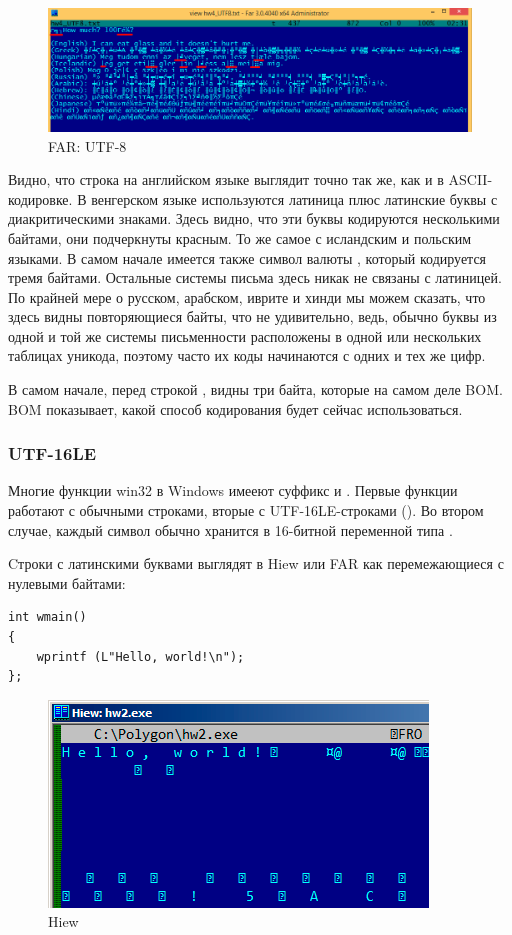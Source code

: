 \begin{figure}[H]
\centering
\includegraphics[scale=\FigScale]{digging_into_code/strings/multilang_sampler_UTF8.png}
\caption{FAR: UTF-8}
\end{figure}

Видно, что строка на английском языке выглядит точно так же, как и в ASCII-кодировке.
В венгерском языке используются латиница плюс латинские буквы с диакритическими знаками.
Здесь видно, что эти буквы кодируются несколькими байтами, они подчеркнуты красным.
То же самое с исландским и польским языками.
В самом начале имеется также символ валюты , который кодируется тремя байтами.
Остальные системы письма здесь никак не связаны с латиницей.
По крайней мере о русском, арабском, иврите и хинди мы можем сказать, что здесь видны повторяющиеся
байты, что не удивительно, ведь, обычно буквы из одной и той же системы письменности расположены в одной
или нескольких таблицах уникода, поэтому часто их коды начинаются с одних и тех же цифр.

В самом начале, перед строкой , видны три байта, которые на самом деле \ac{BOM}.
\ac{BOM} показывает, какой способ кодирования будет сейчас использоваться.

\subsubsection{UTF-16LE}

Многие функции win32 в Windows имееют суффикс  и .
Первые функции работают с обычными строками, вторые с UTF-16LE-строками ().
Во втором случае, каждый символ обычно хранится в 16-битной переменной типа .

Cтроки с латинскими буквами выглядят в Hiew или FAR как перемежающиеся с нулевыми байтами:

\begin{lstlisting}
int wmain()
{
	wprintf (L"Hello, world!\n");
};
\end{lstlisting}

\begin{figure}[H]
\centering
\includegraphics[scale=\NormalScale]{digging_into_code/strings/UTF16-string.png}
\caption{Hiew}
\end{figure}

